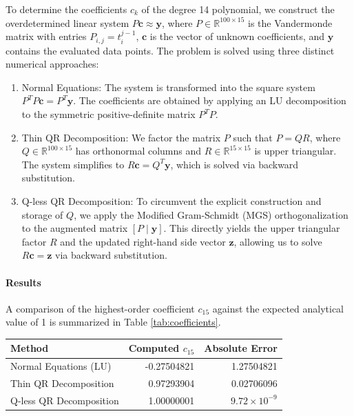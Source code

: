 \begin{solution}

	To determine the coefficients $c_k$ of the degree 14 polynomial, we
	construct the overdetermined linear system $P\mathbf{c} \approx \mathbf{y}$,
	where $P \in \mathbb{R}^{100 \times 15}$ is the Vandermonde matrix with entries
	$P_{i,j} = t_i^{j-1}$, $\mathbf{c}$ is the vector of unknown coefficients, and
	$\mathbf{y}$ contains the evaluated data points. The problem is solved using
	three distinct numerical approaches:
	\begin{enumerate}[label=(\alph*)]
		\item Normal Equations: The system is transformed into the
		      square system $P^T P \mathbf{c} = P^T \mathbf{y}$. The coefficients are obtained
		      by applying an LU decomposition to the symmetric positive-definite matrix $P^T
			      P$.
		\item Thin QR Decomposition: We factor the matrix $P$ such that
		      $P = QR$, where $Q \in \mathbb{R}^{100 \times 15}$ has orthonormal columns and
		      $R \in \mathbb{R}^{15 \times 15}$ is upper triangular. The system simplifies to
		      $R\mathbf{c} = Q^T \mathbf{y}$, which is solved via backward substitution.
		\item Q-less QR Decomposition: To circumvent the explicit
		      construction and storage of $Q$, we apply the Modified Gram-Schmidt (MGS)
		      orthogonalization to the augmented matrix $[P \mid \mathbf{y}]$. This directly
		      yields the upper triangular factor $R$ and the updated right-hand side vector
		      $\mathbf{z}$, allowing us to solve $R\mathbf{c} = \mathbf{z}$ via backward
		      substitution.
	\end{enumerate}

	\paragraph{Results}
	A comparison of the highest-order coefficient $c_{15}$ against the expected
	analytical value of 1 is summarized in Table \ref{tab:coefficients}.

	\begin{center}
		\centering
		\renewcommand{\arraystretch}{1.2}
		\begin{tabular}{lrr}
			\toprule
			Method         & Computed $c_{15}$ & Absolute Error \\
			\midrule
			Normal Equations (LU)   & -0.27504821                & 1.27504821              \\
			Thin QR Decomposition   & 0.97293904                 & 0.02706096              \\
			Q-less QR Decomposition & 1.00000001                 & $9.72 \times 10^{-9}$   \\
			\bottomrule
		\end{tabular}
		\label{tab:coefficients}
	\end{center}


\end{solution}
